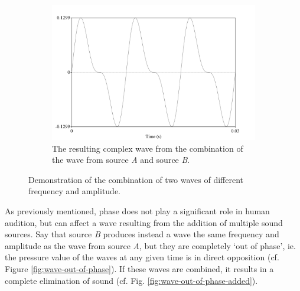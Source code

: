 \documentclass[dissertation,copyright]{uathesis}
\begin{document}
\begin{figure}[h!]
\begin{center}
\begin{subfigure}{0.5\textwidth}
  \includegraphics[width=\textwidth]{figure/sound-wave-addition-combined.png}
  \caption{The resulting complex wave from the combination of the wave from source \textit{A} and source \textit{B}.}
  \label{fig:sound-wave-addition-combined}
\end{subfigure}
\end{center}
\caption{Demonstration of the combination of two waves of different frequency and amplitude.}
\label{fig:sound-wave-addition}
\end{figure}

As previously mentioned, phase does not play a significant role in human audition, but can affect a wave resulting from the addition of multiple sound sources.  Say that source \textit{B} produces instead a wave the same frequency and amplitude as the wave from source \textit{A}, but they are completely `out of phase', ie. the pressure value of the waves at any given time is in direct opposition (cf. Figure \ref{fig:wave-out-of-phase}).  If these waves are combined, it results in a complete elimination of sound (cf. Fig. \ref{fig:wave-out-of-phase-added}).
\end{document}
